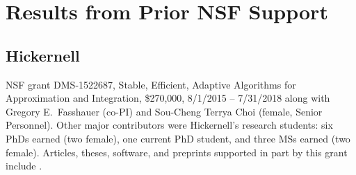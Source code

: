 \documentclass[11pt]{NSFamsart}
\begin{document}
\section{Results from Prior NSF Support}
 
\subsection*{Hickernell} NSF grant DMS-1522687, Stable, Efficient, Adaptive Algorithms for Approximation and Integration,
		\$270,000, 8/1/2015 -- 7/31/2018 along with Gregory E.\ Fasshauer (co-PI) and  Sou-Cheng Terrya Choi (female, Senior Personnel).  Other major contributors were Hickernell's research students: 
		six PhDs earned (two female), one current PhD student, and three MSs earned (two female).
Articles, theses, software, and preprints supported in
part by this grant include
\cite{ala_augmented_2017, ChoEtal17a, ChoEtal20a, Din15a, DinHic20a, GilEtal16a, Hic17a, HicJag18b, HicJim16a, HicEtal18a, HicEtal17a, HicKriWoz19a, RatHic19a, GilJim16b, JimHic16a, JohFasHic18a, Li16a, Liu17a, MarEtal18a, mccourt_stable_2017, MCCEtal19a, mishra_hybrid_2018, MisEtal19a, rashidinia_stable_2016, rashidinia_stable_2018, Zha18a, Zha17a, Zho15a, ZhoHic15a}.

\end{document}
